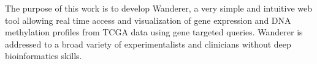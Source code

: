 \documentclass{bmcart}
\begin{document}
The purpose of this work is to develop Wanderer, a very simple and intuitive web tool allowing real time access and visualization of gene expression and DNA methylation profiles from TCGA data using gene targeted queries. Wanderer is addressed to a broad variety of experimentalists and clinicians without deep bioinformatics skills.\\       
  






\end{document}
